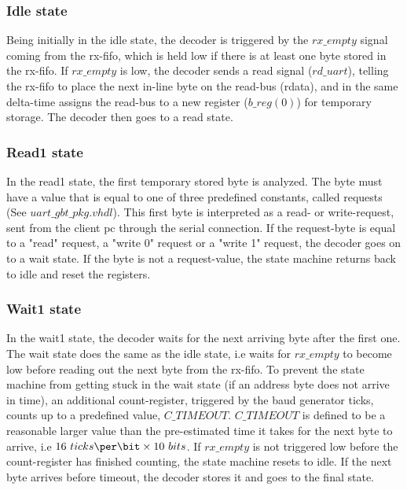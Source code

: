 \documentclass[main.tex]{subfiles}
\begin{document}
\subsubsection{Idle state}
Being initially in the idle state, the decoder is triggered by the $rx\_empty$ signal coming from the rx-fifo, which is held low if there is at least one byte stored in the rx-fifo. If $rx\_empty$ is low, the decoder sends a read signal ($rd\_uart$), telling the rx-fifo to place the next in-line byte on the read-bus (rdata), and in the same delta-time assigns the read-bus to a new register ($b\_reg(0)$) for temporary storage. The decoder then goes to a read state.\\

\subsubsection{Read1 state}
 In the read1 state, the first temporary stored byte is analyzed. The byte must have a value that is equal to one of three predefined constants, called requests (See $uart\_gbt\_pkg.vhdl$). This first byte is interpreted as a read- or write-request, sent from the client \gls{pc} through the serial connection. If the request-byte is equal to a "read" request, a "write 0" request or a "write 1" request, the decoder goes on to a wait state. If the byte is not a request-value, the state machine returns back to idle and reset the registers.\\

\subsubsection{Wait1 state}
  In the wait1 state, the decoder waits for the next arriving byte after the first one. The wait state does the same as the idle state, i.e waits for $rx\_empty$ to become low before reading out the next byte from the rx-fifo. To prevent the state machine from getting stuck in the wait state (if an address byte does not arrive in time), an additional count-register, triggered by the baud generator ticks, counts up to a predefined value, $C\_TIMEOUT$. $C\_TIMEOUT$ is defined to be a reasonable larger value than the pre-estimated time it takes for the next byte to arrive, i.e $16 ~ticks\per\bit \times 10 ~bits$. If $rx\_empty$ is not triggered low before the count-register has finished counting, the state machine resets to idle. If the next byte arrives before timeout, the decoder stores it and goes to the final state.\\
\end{document}
